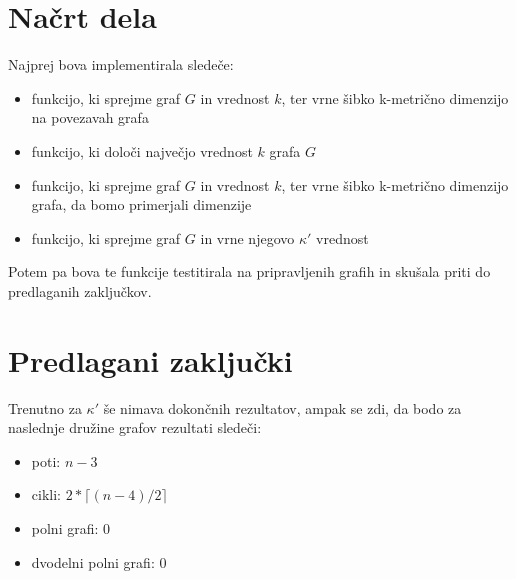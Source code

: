 \documentclass[a4paper,12pt]{article}
\begin{document}
\section{Načrt dela}
Najprej bova implementirala sledeče:
    \begin{itemize}
        \item funkcijo, ki sprejme graf $G$ in vrednost $k$, ter vrne šibko k-metrično dimenzijo na povezavah grafa
        \item funkcijo, ki določi največjo vrednost $k$ grafa $G$
        \item funkcijo, ki sprejme graf $G$ in vrednost $k$, ter vrne šibko k-metrično dimenzijo grafa, da bomo primerjali dimenzije
        \item funkcijo, ki sprejme graf $G$ in vrne njegovo $\kappa'$ vrednost
    \end{itemize}

Potem pa bova te funkcije testitirala na pripravljenih grafih in skušala priti do predlaganih zaključkov.

\section{Predlagani zaključki}
Trenutno za $\kappa'$ še nimava dokončnih rezultatov, ampak se zdi, da bodo za naslednje družine grafov 
rezultati sledeči:
    \begin{itemize}
        \item poti: $n-3$
        \item cikli: $2*\lceil (n-4)/2 \rceil$
        \item polni grafi: $0$
        \item dvodelni polni grafi: $0$
    \end{itemize}
\end{document}

